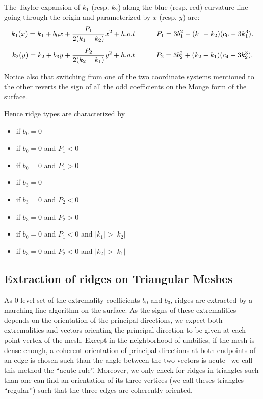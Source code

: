 \noindent The Taylor expansion of $k_1$ (resp. $k_2$) along the blue
(resp. red) curvature line going through the origin and parameterized
by $x$ (resp. $y$) are:
\begin{equation}
\label{eq:taylor_along_line}
k_1(x) = k_1 + b_0x + \frac{P_1}{2(k_1-k_2)}x^2 +h.o.t \quad \quad \quad 
P_1= 3b_1^2+(k_1-k_2)(c_0-3k_1^3).
\end{equation}
%
\begin{equation}
\label{eq:taylor_along_red_line}
k_2(y) = k_2 + b_3y + \frac{P_2}{2(k_2-k_1)}y^2 +h.o.t \quad \quad \quad 
P_2= 3b_2^2+(k_2-k_1)(c_4-3k_2^3).
\end{equation}

\noindent Notice also that switching from one of the two coordinate systems
mentioned to the other reverts the sign of all the odd
coefficients on the Monge form of the surface.
\medskip

Hence ridge types are characterized by 
\begin{itemize}
\item
{} if $b_0=0$
\item
{} if  $b_0=0$ and $P_1<0$
\item
  if  $b_0=0$ and $P_1>0$
\item
  if  $b_3=0$
\item
  if  $b_3=0$ and $P_2<0$
\item
{} if  $b_3=0$ and $P_2>0$
\item
{} if  $b_0=0$  and $P_1<0$ and $|k_1|>|k_2|$
\item
{} if  $b_3=0$ and $P_2<0$ and $|k_2|>|k_1|$
\end{itemize}


\subsection{Extraction of ridges on Triangular Meshes}

As 0-level set of the extremality coefficients $b_0$ and $b_3$, ridges
are extracted by a marching line algorithm on the surface.  As the
signs of these extremalities depends on the orientation of the
principal directions, we expect both extremalities and vectors
orienting the principal direction to be given at each point vertex of
the mesh. Except in the neighborhood of umbilics, if the mesh is dense
enough, a coherent orientation of principal directions at both
endpoints of an edge is chosen such than the angle between the two
vectors is acute-- we call this method the ``acute rule''. Moreover,
we only check for ridges in triangles such than one can find an
orientation of its three vertices (we call theses triangles
``regular'') such that the three edges are coherently oriented.

